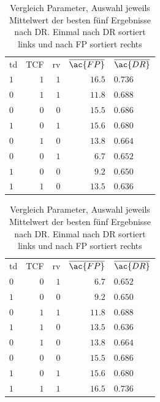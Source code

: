     \begin{table}[ht]
        \parbox{.45\linewidth}{\centering
            \begin{tabular}{lrrrl}
                \hline
                \rowcolor{GruvGray!36}
                \multicolumn{5}{c}{Sortiert nach $\overline{\ac{DR}}$}\\
                \hline
                td  & \ac{TCF} & rv & $\overline{\ac{FP}}$ & $\overline{\ac{DR}}$ \\
                \toprule
                \rowcolor{GruvGray!16}
                $1$ & $1$ & $1$ & $16.5$ & $0.736$ \\
                $0$ & $1$ & $1$ & $11.8$ & $0.688$ \\
                \rowcolor{GruvGray!16}
                $0$ & $0$ & $0$ & $15.5$ & $0.686$ \\
                $1$ & $0$ & $1$ & $15.6$ & $0.680$ \\
                \rowcolor{GruvGray!16}
                $0$ & $1$ & $0$ & $13.8$ & $0.664$ \\
                $0$ & $0$ & $1$ & $6.7$ & $0.652$ \\
                \rowcolor{GruvGray!16}
                $1$ & $0$ & $0$ & $9.2$ & $0.650$ \\
                $1$ & $1$ & $0$ & $13.5$ & $0.636$ \\
                \hline
            \end{tabular}}
        \hfill
        \parbox{.45\linewidth}{\centering
            \begin{tabular}{lrrrl}
                \hline
                \rowcolor{GruvGray!36}
                \multicolumn{5}{c}{Sortiert nach $\overline{\ac{FP}}$}\\
                \hline
                td  & \ac{TCF} & rv & $\overline{\ac{FP}}$ & $\overline{\ac{DR}}$ \\
                \toprule
                \rowcolor{GruvGray!16}
                $0$ & $0$ & $1$ & $6.7$ & $0.652$ \\
                $1$ & $0$ & $0$ & $9.2$ & $0.650$ \\
                \rowcolor{GruvGray!16}
                $0$ & $1$ & $1$ & $11.8$ & $0.688$ \\
                $1$ & $1$ & $0$ & $13.5$ & $0.636$ \\
                \rowcolor{GruvGray!16}
                $0$ & $1$ & $0$ & $13.8$ & $0.664$ \\
                $0$ & $0$ & $0$ & $15.5$ & $0.686$ \\
                \rowcolor{GruvGray!16}
                $1$ & $0$ & $1$ & $15.6$ & $0.680$ \\
                $1$ & $1$ & $1$ & $16.5$ & $0.736$ \\
                \hline
            \end{tabular}}
        \caption[Parameter Vergleich]{Vergleich Parameter, Auswahl jeweils Mittelwert der besten fünf Ergebnisse nach \ac{DR}. Einmal nach \ac{DR} sortiert links und nach \ac{FP} sortiert rechts}
        \label{tab:LSTM_para_vgl}
    \end{table}

